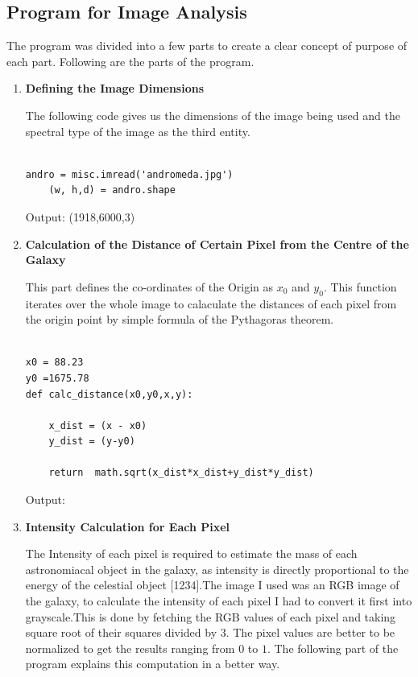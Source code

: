 \subsection{Program for Image Analysis}
The program was divided into a few parts to create a clear concept of purpose of each part. Following are the parts of the program.
\begin{enumerate}
\item \textbf{Defining the Image Dimensions}

The following code gives us the dimensions of the image being used and the spectral type of the image as the third entity.

\begin{verbatim}

andro = misc.imread('andromeda.jpg')
    (w, h,d) = andro.shape
\end{verbatim}

Output: (1918,6000,3)


\item \textbf{Calculation of the Distance of Certain Pixel from the Centre of the Galaxy}

This part defines the co-ordinates of the Origin as $x_{0}$ and $y_{0}$. This function iterates over the whole image to calaculate the distances of each pixel from the origin point by simple formula of the Pythagoras theorem.

\begin{verbatim}

x0 = 88.23
y0 =1675.78
def calc_distance(x0,y0,x,y):

    x_dist = (x - x0)
    y_dist = (y-y0)

    return  math.sqrt(x_dist*x_dist+y_dist*y_dist)

\end{verbatim}
Output:

\item \textbf{Intensity Calculation for Each Pixel}

The Intensity of each pixel is required to estimate the mass of each astronomiacal object in the galaxy, as intensity is directly proportional to the energy of the celestial object [1234].The image I used was an RGB image of the galaxy, to calculate the intensity of each pixel I had to convert it first into grayscale.This is done by fetching the RGB values of each pixel and taking square root of their squares divided by $3$. The pixel values are better to be normalized to get the results ranging from $0$ to $1$. The following part of the program explains this computation in a better way.


\end{enumerate}

